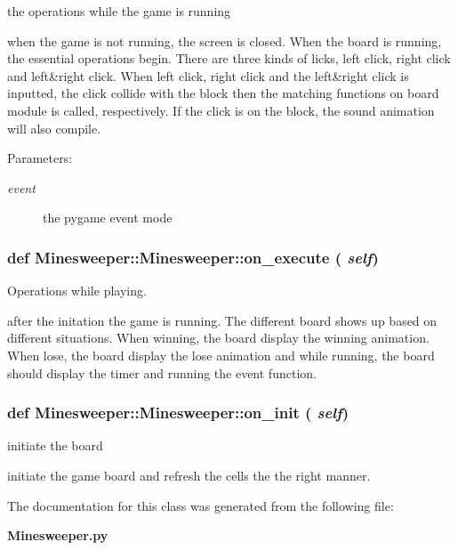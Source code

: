 the operations while the game is running 

when the game is not running, the screen is closed. When the board is running, the essential operations begin. There are three kinds of licks, left click, right click and left\&right click. When left click, right click and the left\&right click is inputted, the click collide with the block then the matching functions on board module is called, respectively. If the click is on the block, the sound animation will also compile. \begin{Desc}
\item[Parameters:]
\begin{description}
\item[{\em event}]the pygame event mode \end{description}
\end{Desc}
\subsubsection{\setlength{\rightskip}{0pt plus 5cm}def Minesweeper::Minesweeper::on\_\-execute ( {\em self})}\label{classMinesweeper_1_1Minesweeper_ec92f8bd8622d9e9c4fe9b1354d90c24}


Operations while playing. 

after the initation the game is running. The different board shows up based on different situations. When winning, the board display the winning animation. When lose, the board display the lose animation and while running, the board should display the timer and running the event function. 
\subsubsection{\setlength{\rightskip}{0pt plus 5cm}def Minesweeper::Minesweeper::on\_\-init ( {\em self})}\label{classMinesweeper_1_1Minesweeper_b5e438adee984b865c7a662ca2a5028a}


initiate the board 

initiate the game board and refresh the cells the the right manner. 

The documentation for this class was generated from the following file:\begin{CompactItemize}
\item 
\bf{Minesweeper.py}\end{CompactItemize}
